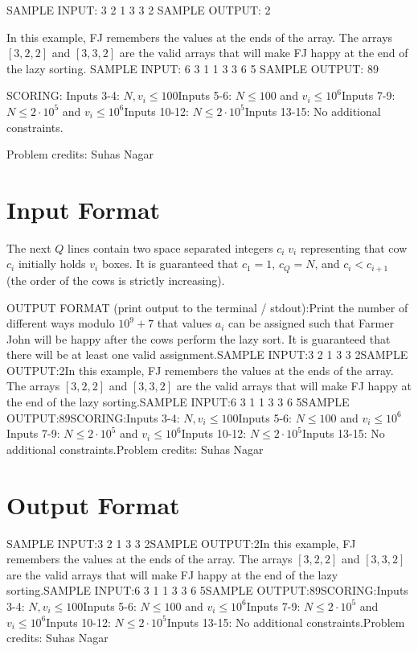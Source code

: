 \documentclass[12pt]{article}
\begin{document}
SAMPLE INPUT:
3 2
1 3
3 2
SAMPLE OUTPUT: 
2

In this example, FJ remembers the values at the ends of the array. The arrays
$[3,2,2]$ and $[3,3,2]$ are the valid arrays that will make FJ happy at the end
of the lazy sorting.
SAMPLE INPUT:
6 3
1 1
3 3
6 5
SAMPLE OUTPUT: 
89

SCORING:
Inputs 3-4: $N,v_i\le 100$Inputs 5-6: $N\le 100$ and $v_i \leq 10^6$Inputs 7-9: $N \leq 2\cdot 10^5$ and $v_i \le 10^6$Inputs 10-12: $N \leq 2\cdot 10^5$Inputs 13-15: No additional constraints.


Problem credits: Suhas Nagar



\section*{Input Format}
The next $Q$ lines contain two space separated integers $c_i \; v_i$
representing that cow $c_i$ initially holds $v_i$ boxes. It is guaranteed that
$c_1 = 1$, $c_Q = N$, and $c_i < c_{i+1}$ (the order of the cows is strictly
increasing).

OUTPUT FORMAT (print output to the terminal / stdout):Print the number of different ways modulo $10^9+7$ that values $a_i$ can be
assigned such that Farmer John will be happy after the cows perform the lazy
sort. It is guaranteed that there will be at least one valid assignment.SAMPLE INPUT:3 2
1 3
3 2SAMPLE OUTPUT:2In this example, FJ remembers the values at the ends of the array. The arrays
$[3,2,2]$ and $[3,3,2]$ are the valid arrays that will make FJ happy at the end
of the lazy sorting.SAMPLE INPUT:6 3
1 1
3 3
6 5SAMPLE OUTPUT:89SCORING:Inputs 3-4: $N,v_i\le 100$Inputs 5-6: $N\le 100$ and $v_i \leq 10^6$Inputs 7-9: $N \leq 2\cdot 10^5$ and $v_i \le 10^6$Inputs 10-12: $N \leq 2\cdot 10^5$Inputs 13-15: No additional constraints.Problem credits: Suhas Nagar

\section*{Output Format}
SAMPLE INPUT:3 2
1 3
3 2SAMPLE OUTPUT:2In this example, FJ remembers the values at the ends of the array. The arrays
$[3,2,2]$ and $[3,3,2]$ are the valid arrays that will make FJ happy at the end
of the lazy sorting.SAMPLE INPUT:6 3
1 1
3 3
6 5SAMPLE OUTPUT:89SCORING:Inputs 3-4: $N,v_i\le 100$Inputs 5-6: $N\le 100$ and $v_i \leq 10^6$Inputs 7-9: $N \leq 2\cdot 10^5$ and $v_i \le 10^6$Inputs 10-12: $N \leq 2\cdot 10^5$Inputs 13-15: No additional constraints.Problem credits: Suhas Nagar
\end{document}
